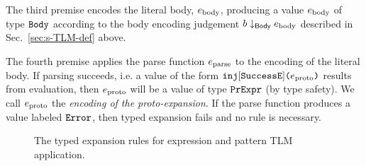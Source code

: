 \documentclass[acmsmall,screen]{acmart}
\begin{document}
The third premise encodes the literal body, $\ebody$, producing a value $\ebody$ of type $\tBody$ according to the body encoding judgement $\encodeBody{b}{\ebody}$ described in Sec.~\ref{sec:s-TLM-def} above.

The fourth premise applies the parse function $\eparse$ to the encoding of the literal body. If parsing succeeds, i.e. a value of the form $\aein{\mathtt{SuccessE}}{\ecand}$ results from evaluation, then $\ecand$ will be a value of type $\tCEExp$ (by type safety). We call $\ecand$ the \emph{encoding of the proto-expansion}. If the parse function produces a value labeled $\lbltxt{Error}$, then typed expansion fails and no rule is necessary.



\begin{figure*}
{\small\begin{mathpar}
\end{mathpar}}
{\small\begin{mathpar}
\end{mathpar}}
\caption{The typed expansion rules for expression and pattern TLM application.}
\label{fig:ee-ap-setlm}
\end{figure*}
\end{document}
